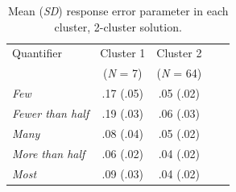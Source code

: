 \documentclass{article}
\begin{document}
\begin{table}[H]
    \centering
    \caption{Mean (\textit{SD}) response error parameter in each cluster, 2-cluster solution.}
    \label{tab:tab2.4}
    \begin{tabular}{lcccc}\hline
        Quantifier & Cluster 1 & Cluster 2 \\
        & (\textit{N} = 7) & (\textit{N} = 64) \\ \hline
         \textit{Few} & .17 (.05) & .05 (.02)\\
         \textit{Fewer than half} & .19 (.03) & .06 (.03)\\
         \textit{Many} & .08 (.04) & .05 (.02)\\
         \textit{More than half} & .06 (.02) & .04 (.02)\\
         \textit{Most} & .09 (.03) & .04 (.02)\\ \hline
    \end{tabular}
\end{table}
\end{document}
